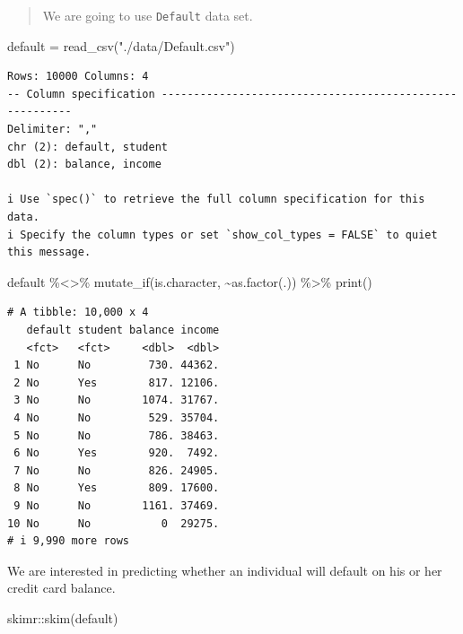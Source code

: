 \documentclass[
  letterpaper,
  DIV=11,
  numbers=noendperiod]{scrreprt}
\newenvironment{Shaded}{\begin{snugshade}}{\end{snugshade}}
\newcommand{\FunctionTok}[1]{\textcolor[rgb]{0.02,0.16,0.49}{#1}}
\newcommand{\NormalTok}[1]{\textcolor[rgb]{0.33,0.33,0.33}{#1}}
\newcommand{\OtherTok}[1]{\textcolor[rgb]{0.85,0.12,0.09}{#1}}
\newcommand{\SpecialCharTok}[1]{\textcolor[rgb]{0.00,0.46,0.62}{#1}}
\newcommand{\StringTok}[1]{\textcolor[rgb]{0.00,0.50,0.00}{#1}}
\begin{document}
\begin{quote}
We are going to use \texttt{Default} data set.
\end{quote}

\begin{Shaded}
\begin{Highlighting}[]
\NormalTok{default }\OtherTok{=} \FunctionTok{read\_csv}\NormalTok{(}\StringTok{"./data/Default.csv"}\NormalTok{)}
\end{Highlighting}
\end{Shaded}

\begin{verbatim}
Rows: 10000 Columns: 4
-- Column specification --------------------------------------------------------
Delimiter: ","
chr (2): default, student
dbl (2): balance, income

i Use `spec()` to retrieve the full column specification for this data.
i Specify the column types or set `show_col_types = FALSE` to quiet this message.
\end{verbatim}

\begin{Shaded}
\begin{Highlighting}[]
\NormalTok{default }\SpecialCharTok{\%\textless{}\textgreater{}\%} 
  \FunctionTok{mutate\_if}\NormalTok{(is.character, }\SpecialCharTok{\textasciitilde{}}\FunctionTok{as.factor}\NormalTok{(.)) }\SpecialCharTok{\%\textgreater{}\%} 
  \FunctionTok{print}\NormalTok{()}
\end{Highlighting}
\end{Shaded}

\begin{verbatim}
# A tibble: 10,000 x 4
   default student balance income
   <fct>   <fct>     <dbl>  <dbl>
 1 No      No         730. 44362.
 2 No      Yes        817. 12106.
 3 No      No        1074. 31767.
 4 No      No         529. 35704.
 5 No      No         786. 38463.
 6 No      Yes        920.  7492.
 7 No      No         826. 24905.
 8 No      Yes        809. 17600.
 9 No      No        1161. 37469.
10 No      No           0  29275.
# i 9,990 more rows
\end{verbatim}

We are interested in predicting whether an individual will default on
his or her credit card balance.

\begin{Shaded}
\begin{Highlighting}[]
\NormalTok{skimr}\SpecialCharTok{::}\FunctionTok{skim}\NormalTok{(default)}
\end{Highlighting}
\end{Shaded}
\end{document}
